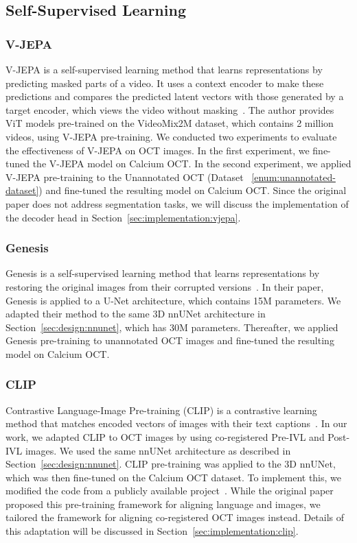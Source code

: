 \documentclass[a4paper,11pt,oneside]{report}
\begin{document}
\subsection{Self-Supervised Learning}
\subsubsection{V-JEPA}
V-JEPA is a self-supervised learning method that learns representations by predicting masked parts of a video. It uses a context encoder to make these predictions and compares the predicted latent vectors with those generated by a target encoder, which views the video without masking~\cite{Bardes2024Vjepa}. The author provides ViT models pre-trained on the VideoMix2M dataset, which contains 2 million videos, using V-JEPA pre-training. We conducted two experiments to evaluate the effectiveness of V-JEPA on OCT images. In the first experiment, we fine-tuned the V-JEPA model on Calcium OCT. In the second experiment, we applied V-JEPA pre-training to the Unannotated OCT (Dataset ~\ref{enum:unannotated-dataset}) and fine-tuned the resulting model on Calcium OCT. Since the original paper does not address segmentation tasks, we will discuss the implementation of the decoder head in Section~\ref{sec:implementation:vjepa}.

\subsubsection{Genesis}
Genesis is a self-supervised learning method that learns representations by restoring the original images from their corrupted versions~\cite{Zhou2021}. In their paper, Genesis is applied to a U-Net architecture, which contains 15M parameters. We adapted their method to the same 3D nnUNet architecture in Section~\ref{sec:design:nnunet}, which has 30M parameters. Thereafter, we applied Genesis pre-training to unannotated OCT images and fine-tuned the resulting model on Calcium OCT.

\subsubsection{CLIP}
Contrastive Language-Image Pre-training (CLIP) is a contrastive learning method that matches encoded vectors of images with their text captions~\cite{Radford2021CLIP}. In our work, we adapted CLIP to OCT images by using co-registered Pre-IVL and Post-IVL images. We used the same nnUNet architecture as described in Section~\ref{sec:design:nnunet}. CLIP pre-training was applied to the 3D nnUNet, which was then fine-tuned on the Calcium OCT dataset. To implement this, we modified the code from a publicly available project~\cite{Shariatnia2021}. While the original paper proposed this pre-training framework for aligning language and images, we tailored the framework for aligning co-registered OCT images instead. Details of this adaptation will be discussed in Section~\ref{sec:implementation:clip}. 
\end{document}
